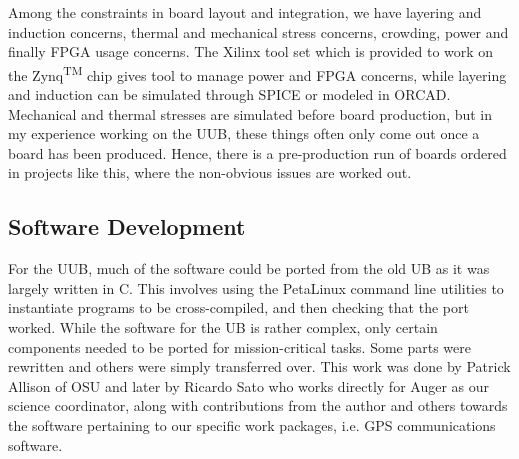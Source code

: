 Among the constraints in board layout and integration, we have layering and induction concerns, thermal and mechanical stress concerns, crowding, power and finally FPGA usage concerns. The Xilinx tool set which is provided to work on the Zynq\textsuperscript{TM} chip gives tool to manage power and FPGA concerns, while layering and induction can be simulated through SPICE or modeled in ORCAD. Mechanical and thermal stresses are simulated before board production, but in my experience working on the UUB, these things often only come out once a board has been produced. Hence, there is a pre-production run of boards ordered in projects like this, where the non-obvious issues are worked out. 
\subsection{Software Development}
For the UUB, much of the software could be ported from the old UB as it was largely written in C. This involves using the PetaLinux command line utilities to instantiate programs to be cross-compiled, and then checking that the port worked. While the software for the UB is rather complex, only certain components needed to be ported for mission-critical tasks. Some parts were rewritten and others were simply transferred over. This work was done by Patrick Allison of OSU and later by Ricardo Sato who works directly for Auger as our science coordinator, along with contributions from the author and others towards the software pertaining to our specific work packages, i.e. GPS communications software. 

